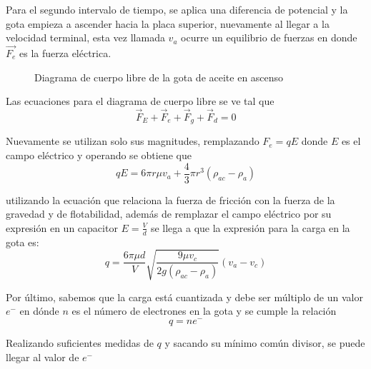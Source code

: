 Para el segundo intervalo de tiempo, se aplica una diferencia de potencial y la
gota empieza a ascender hacia la placa superior, nuevamente al llegar a la
velocidad terminal, esta vez llamada $v_a$ ocurre un equilibrio de fuerzas en
donde $\vec{F_e}$ es la fuerza eléctrica.
\begin{figure}
    \centering
    \caption{Diagrama de cuerpo libre de la gota de aceite en ascenso}
    \label{fig:fbd-ascending-drop}
\end{figure}

Las ecuaciones para el diagrama de cuerpo libre se ve tal que
\begin{equation}
    \vec{F}_E + \vec{F}_e + \vec{F}_g + \vec{F}_d = 0
\end{equation}

Nuevamente se utilizan solo sus magnitudes, remplazando $F_e=qE$ donde $E$ es
el campo eléctrico y operando se obtiene que
\begin{equation}
    qE = 6\pi r\mu v_a + \frac{4}{3}\pi r^3(\rho_{ac}-\rho_a)
\end{equation}

utilizando la ecuación que relaciona la fuerza de fricción con la fuerza de la
gravedad y de flotabilidad, además de remplazar el campo eléctrico por su
expresión en un capacitor $E=\frac{V}{d}$ se llega a que la expresión para la
carga en la gota es:
\begin{equation}
    q = \frac{6\pi \mu d}{V}\sqrt{\frac{9\mu v_c}{2g(\rho_{ac}-\rho_a)}}(v_a-v_c)
\end{equation}

Por último, sabemos que la carga está cuantizada y debe ser múltiplo de un
valor $e^-$ en dónde $n$ es el número de electrones en la gota y se cumple la
relación
\begin{equation}
    q=ne^-
\end{equation}

Realizando suficientes medidas de $q$ y sacando su mínimo común divisor,
se puede llegar al valor de $e^-$
